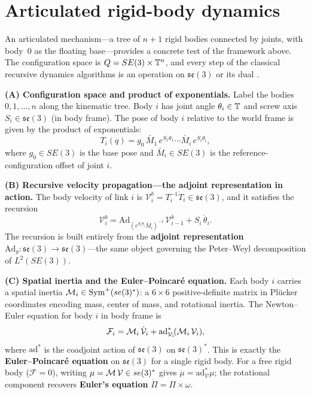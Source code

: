 \section{Articulated rigid-body dynamics}\label{sec:articulated}

An articulated mechanism---a tree of $n+1$ rigid bodies connected by joints,
with body~$0$ as the floating base---provides a concrete test of the framework
above.
The configuration space is $Q = SE(3) \times \mathbb{T}^n$, and every step of the classical recursive
dynamics algorithms is an operation on $\mathfrak{se}(3)$ or its dual
\cite{Featherstone,MurrayLiSastry}.

\medskip\noindent\textbf{(A) Configuration space and product of exponentials.}
Label the bodies $0, 1, \ldots, n$ along the kinematic tree.
Body $i$ has joint angle $\theta_i \in \mathbb{T}$ and screw axis
$S_i \in \mathfrak{se}(3)$ (in body frame).
The pose of body $i$ relative to the world frame is given by the product of
exponentials:
\[
T_i(q)
= g_0 \, \bar{M}_1 \, e^{S_1 \theta_1} \cdots \bar{M}_i \, e^{S_i \theta_i},
\]
where $g_0 \in SE(3)$ is the base pose and
$\bar{M}_i \in SE(3)$ is the reference-configuration offset of joint $i$.

\medskip\noindent\textbf{(B) Recursive velocity propagation---the adjoint
representation in action.}
The body velocity of link $i$ is
$\mathcal{V}_i^b = T_i^{-1}\dot{T}_i \in \mathfrak{se}(3)$, and it
satisfies the recursion
\[
\mathcal{V}_i^b
= \mathrm{Ad}_{(e^{S_i\theta_i}\bar{M}_i)^{-1}}\,\mathcal{V}_{i-1}^b
  + S_i\,\dot{\theta}_i.
\]
The recursion is built entirely from the \textbf{adjoint representation}
$\mathrm{Ad}_g : \mathfrak{se}(3) \to \mathfrak{se}(3)$---the same object
governing the Peter--Weyl decomposition of $L^2(SE(3))$.

\medskip\noindent\textbf{(C) Spatial inertia and the Euler--Poincar\'e
equation.}
Each body $i$ carries a spatial inertia
$\mathcal{M}_i \in \mathrm{Sym}^+(se(3)^*)$: a $6 \times 6$
positive-definite matrix in Pl\"ucker coordinates encoding mass, center of
mass, and rotational inertia.
The Newton--Euler equation for body $i$ in body frame is
\[
\mathcal{F}_i
= \mathcal{M}_i\,\dot{\mathcal{V}}_i
  + \mathrm{ad}^*_{\mathcal{V}_i}\!(\mathcal{M}_i\,\mathcal{V}_i),
\]
where $\mathrm{ad}^*$ is the coadjoint action of $\mathfrak{se}(3)$ on
$\mathfrak{se}(3)^*$.
This is exactly the \textbf{Euler--Poincar\'e equation} on $\mathfrak{se}(3)$
for a single rigid body.
For a free rigid body ($\mathcal{F} = 0$), writing
$\mu = \mathcal{M}\,\mathcal{V} \in se(3)^*$ gives
$\dot{\mu} = \mathrm{ad}^*_{\mathcal{V}}\mu$; the rotational component
recovers \textbf{Euler's equation} $\dot{\Pi} = \Pi \times \omega$.

